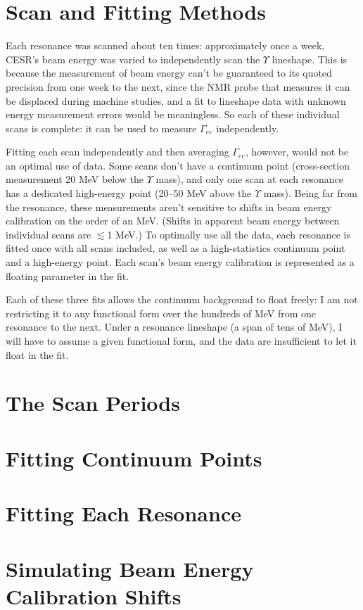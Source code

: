\section{Scan and Fitting Methods}

Each resonance was scanned about ten times: approximately once a week,
CESR's beam energy was varied to independently scan the $\Upsilon$
lineshape.  This is because the measurement of beam energy can't be
guaranteed to its quoted precision from one week to the next, since
the NMR probe that measures it can be displaced during machine
studies, and a fit to lineshape data with unknown energy measurement
errors would be meaningless.  So each of these individual scans is
complete: it can be used to measure $\Gamma_{ee}$ independently.

Fitting each scan independently and then averaging $\Gamma_{ee}$,
however, would not be an optimal use of data.  Some scans don't have a
continuum point (cross-section measurement 20 MeV below the $\Upsilon$
mass), and only one scan at each resonance has a dedicated high-energy
point (20--50 MeV above the $\Upsilon$ mass).  Being far from the
resonance, these measurements aren't sensitive to shifts in beam
energy calibration on the order of an MeV.  (Shifts in apparent beam
energy between individual scans are $\lesssim$1 MeV.)  To optimally
use all the data, each resonance is fitted once with all scans
included, as well as a high-statistics continuum point and a
high-energy point.  Each scan's beam energy calibration is represented
as a floating parameter in the fit.

Each of these three fits allows the continuum background to float
freely: I am not restricting it to any functional form over the
hundreds of MeV from one resonance to the next.  Under a resonance
lineshape (a span of tens of MeV), I will have to assume a given
functional form, and the data are insufficient to let it float in the
fit.






\section{The Scan Periods}

\section{Fitting Continuum Points}

\section{Fitting Each Resonance}

\section{Simulating Beam Energy Calibration Shifts}





